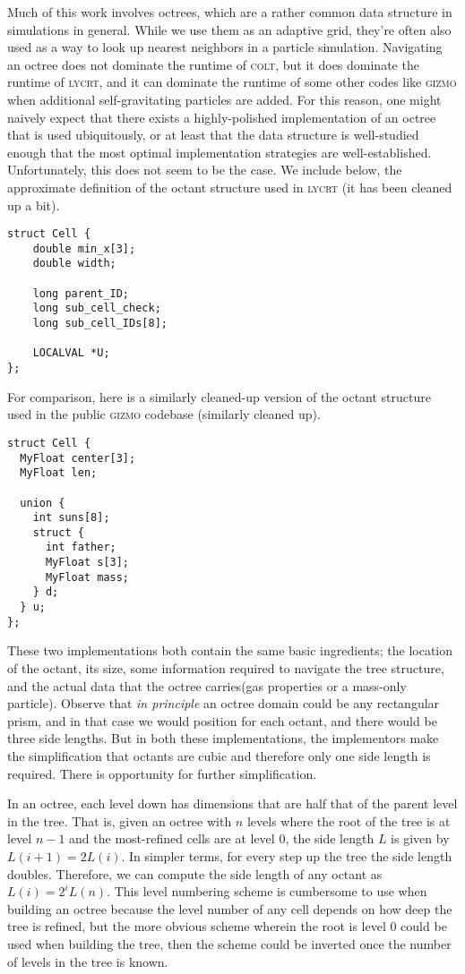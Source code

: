 Much of this work involves octrees, which are a rather common data structure in simulations in general.
While we use them as an adaptive grid, they're often also used as a way to look up nearest neighbors in a particle simulation.
Navigating an octree does not dominate the runtime of \textsc{colt}, but it does dominate the runtime of \textsc{lycrt}, and it can dominate the runtime of some other codes like \textsc{gizmo} when additional self-gravitating particles are added.
For this reason, one might naively expect that there exists a highly-polished implementation of an octree that is used ubiquitously, or at least that the data structure is well-studied enough that the most optimal implementation strategies are well-established.
Unfortunately, this does not seem to be the case.
We include below, the approximate definition of the octant structure used in \textsc{lycrt} (it has been cleaned up a bit).
\begin{lstlisting}
struct Cell {
    double min_x[3];
    double width;

    long parent_ID;
    long sub_cell_check;
    long sub_cell_IDs[8];

    LOCALVAL *U;
};
\end{lstlisting}
For comparison, here is a similarly cleaned-up version of the octant structure used in the public \textsc{gizmo} codebase (similarly cleaned up).
\begin{lstlisting}
struct Cell {
  MyFloat center[3];
  MyFloat len;

  union {
    int suns[8];
    struct {
      int father;
      MyFloat s[3];
      MyFloat mass;
    } d;
  } u;
};
\end{lstlisting}
These two implementations both contain the same basic ingredients; the location of the octant, its size, some information required to navigate the tree structure, and the actual data that the octree carries(gas properties or a mass-only particle).
Observe that \emph{in principle} an octree domain could be any rectangular prism, and in that case we would position for each octant, and there would be three side lengths.
But in both these implementations, the implementors make the simplification that octants are cubic and therefore only one side length is required.
There is opportunity for further simplification.

In an octree, each level down has dimensions that are half that of the parent level in the tree.
That is, given an octree with $n$ levels where the root of the tree is at level $n-1$ and the most-refined cells are at level $0$, the side length $L$ is given by $L(i+1) = 2L(i)$.
In simpler terms, for every step up the tree the side length doubles.
Therefore, we can compute the side length of any octant as $L(i) = 2^{i} L(n)$.
This level numbering scheme is cumbersome to use when building an octree because the level number of any cell depends on how deep the tree is refined, but the more obvious scheme wherein the root is level $0$ could be used when building the tree, then the scheme could be inverted once the number of levels in the tree is known.

